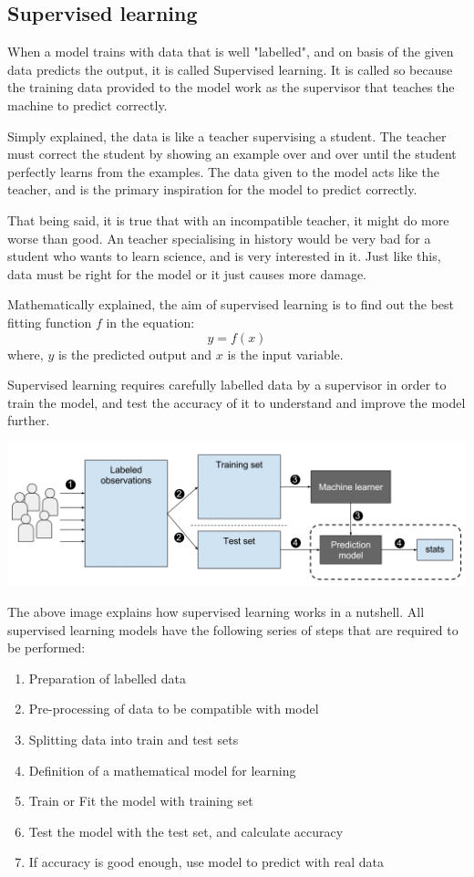 \documentclass[a4paper,oneside,12pt]{book}
\begin{document}
\subsection{Supervised learning}\label{subsec:supe}

When a model trains with data that is well "labelled", and on basis of the given data predicts the output, it is called Supervised learning. It is called so because the training data provided to the model work as the supervisor that teaches the machine to predict correctly. 

Simply explained, the data is like a teacher supervising a student. The teacher must correct the student by showing an example over and over until the student perfectly learns from the examples. The data given to the model acts like the teacher, and is the primary inspiration for the model to predict correctly. 

That being said, it is true that with an incompatible teacher, it might do more worse than good. An teacher specialising in history would be very bad for a student who wants to learn science, and is very interested in it. Just like this, data must be right for the model or it just causes more damage.

Mathematically explained, the aim of supervised learning is to find out the best fitting function $f$ in the equation: \[y=f(x)\] where, $y$ is the predicted output and $x$ is the input variable. 

Supervised learning requires carefully labelled data by a supervisor in order to train the model, and test the accuracy of it to understand and improve the model further.

\includegraphics[width=\columnwidth]{../media/intro/Supervised_machine_learning_in_a_nutshell.svg_.png}

The above image explains how supervised learning works in a nutshell. All supervised learning models have the following series of steps that are required to be performed:

\begin{enumerate}
    \item Preparation of labelled data
    \item Pre-processing of data to be compatible with model
    \item Splitting data into train and test sets
    \item Definition of a mathematical model for learning
    \item Train or Fit the model with training set
    \item Test the model with the test set, and calculate accuracy
    \item If accuracy is good enough, use model to predict with real data
\end{enumerate}
\end{document}
